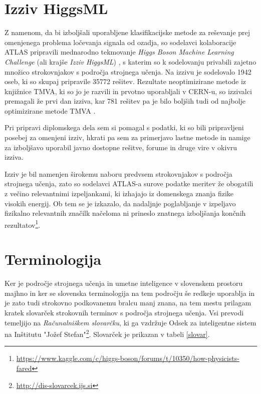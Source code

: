 \documentclass[11pt,a4paper,openany]{book}
\begin{document}
\section*{Izziv HiggsML}
Z namenom, da bi izboljšali uporabljene klasifikacijske metode za reševanje prej omenjenega problema ločevanja signala od ozadja, so sodelavci kolaboracije ATLAS pripravili mednarodno tekmovanje \textit{Higgs Boson Machine Learning Challenge} (ali krajše \textit{Izziv HiggsML}) \cite{HiggsMLChallenge}, s katerim so k sodelovanju privabili zajetno množico strokovnjakov s področja strojnega učenja. Na izzivu je sodelovalo 1942 oseb, ki so skupaj pripravile 35772 rešitev. Rezultate neoptimizirane metode iz knjižnice TMVA, ki so jo je razvili in prvotno uporabljali v CERN-u, so izzivalci premagali že prvi dan izziva, kar 781 rešitev pa je bilo boljših tudi od najbolje optimizirane metode TMVA \cite{Adam-Bourdarios14}.

Pri pripravi diplomskega dela sem si pomagal s podatki, ki so bili pripravljeni posebej za omenjeni izziv, hkrati pa sem za primerjavo lastne metode in namige za izboljšavo uporabil javno dostopne rešitve, forume in druge vire v okivru izziva.

Izziv je bil namenjen širokemu naboru predvsem strokovnjakov s področja strojnega učenja, zato so sodelavci ATLAS-a surove podatke meritev že obogatili z večino relevantnimi izpeljankami, ki izhajajo iz domenskega znanja fizike visokih energij. Ob tem se je izkazalo, da nadaljnje poglabljanje v izpeljavo fizikalno relevantnih značilk načeloma ni prineslo znatnega izboljšanja končnih rezultatov\footnote{\url{https://www.kaggle.com/c/higgs-boson/forums/t/10350/how-physicists-fared}}.


\section*{Terminologija}

Ker je področje strojnega učenja in umetne inteligence v slovenskem prostoru majhno in ker se slovenska terminologija na tem področju še redkeje uporablja in je zato tudi strokovno podkovanemu bralcu manj znana, na tem mestu prilagam kratek slovarček strokovnih terminov s področja strojnega učenja. Vsi prevodi temeljijo na \textit{Računalniškem slovarčku}, ki ga vzdržuje Odsek za inteligentne sistem na Inštitutu "Jožef Stefan"\footnote{\url{http://dis-slovarcek.ijs.si}}. Slovarček je prikazan v tabeli \ref{slovar}.


\end{document}
